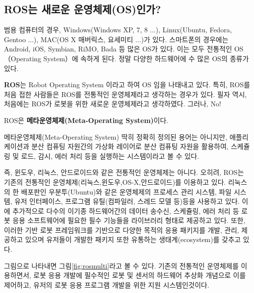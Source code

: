 \subsection{ROS는 새로운 운영체제(OS)인가?}

범용 컴퓨터의 경우, Windows(Windows XP, 7, 8 ...), Linux(Ubuntu, Fedora, Gentoo ...), MAC(OS X 매버릭스, 요세미티 ...)가 있다.
스마트폰의 경우에는 Android, iOS, Symbian, RiMO, Bada 등 많은 OS가 있다.
이는 모두 전통적인 OS（Operating System）에 속하게 된다.
정말 다양한 하드웨어에 수 많은 OS의 종류가 있다. 

\textbf{ROS}는 Robot Operating System 이라고 하여 OS 임을 나태내고 있다.
특히, ROS를 처음 접한 사람들은 ROS를 전통적인 운영체제라고 생각하는 경우가 있다.
필자 역시, 처음에는 ROS가 로봇을 위한 새로운 운영체제라고 생각하였다. 그러나, No!

\begin{center} 
ROS은 \textbf{메타운영체제(Meta-Operating System)}이다.
\end{center}

메타운영체제(Meta-Operating System) 딱히 정확히 정의된 용어는 아니지만, 애플리케이션과 분산 컴퓨팅 자원간의 가상화 레이어로 분산 컴퓨팅 자원을 활용하여, 스케쥴링 및 로드, 감시, 에러 처리 등을 실행하는 시스템이라고 볼 수 있다.

즉, 윈도우, 리눅스, 안드로이드와 같은 전통적인 운영체제는 아니다.
오히려, ROS는 기존의 전통적인 운영체제(리눅스,윈도우,OS-X,안드로이드)를 이용하고 있다.
리눅스의 한 배포판인 우분투(Ubuntu)와 같은 운영체제의 프로세스 관리 시스템, 파일 시스템, 유저 인터페이스, 프로그램 유틸(컴파일러, 스레드 모델 등)등을 사용하고 있다.
이에 추가적으로 다수의 이기종 하드웨어간의 데이터 송수신, 스케쥴링, 에러 처리 등 로봇 응용 소프트웨어에 필요한 필수 기능들을 라이브러리 형태로 제공하고 있다.
또한, 이러한 기반 로봇 프레임워크를 기반으로 다양한 목적의 응용 패키지를 개발, 관리, 제공하고 있으며 유저들이 개발한 패키지 또한 유통하는 생태계(ecosystem)를 갖추고 있다.

그림으로 나타내면 그림\ref{fig:rosmulti}라고 볼 수 있다. 기존의 전통적인 운영체제를 이용하면서, 로봇 응용 개발에 필수적인 로봇 및 센서의 하드웨어 추상화 개념으로 이를 제어하고, 유저의 로봇 응용 프로그램 개발을 위한 지원 시스템인것이다.

